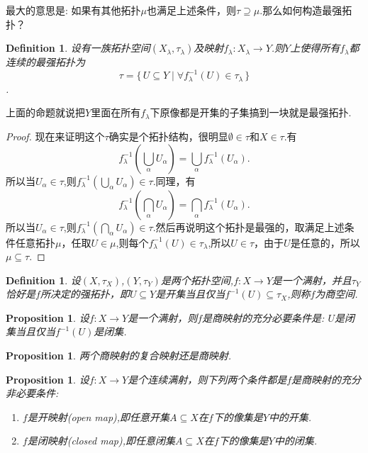 \documentclass{article}
\newtheorem{proposition}[theorem]{Proposition}
\newtheorem{definition}[theorem]{Definition}
\newcommand*{\xfunc}[4]{{#2}\colon{#3}{#1}{#4}}
\newcommand*{\func}[3]{\xfunc{\to}{#1}{#2}{#3}}
\newcommand\Set[2]{\{\,#1\mid#2\,\}} %
\begin{document}
最大的意思是: 如果有其他拓扑$\mu$也满足上述条件，则$\tau \supseteq \mu$.那么如何构造最强拓扑？

\begin{definition}
设有一族拓扑空间$(X_\lambda,\tau_\lambda)$及映射$\func{f_\lambda}{X_\lambda}{Y}$.则$Y$上使得所有$f_\lambda$都连续的最强拓扑为\[\tau = \Set{U \subseteq Y}{\forall f_\lambda^{-1}(U) \in \tau_\lambda}\].
\end{definition}

上面的命题就说把$Y$里面在所有$f_\lambda$下原像都是开集的子集搞到一块就是最强拓扑.

\begin{proof}
现在来证明这个$\tau$确实是个拓扑结构，很明显$\emptyset \in \tau$和$X \in \tau$.有\[f^{-1}_\lambda(\bigcup\limits_{\alpha} U_\alpha)=\bigcup\limits_\alpha f_\lambda^{-1}(U_\alpha).\]所以当$U_\alpha \in \tau$,则$f^{-1}_\lambda(\bigcup\limits_{\alpha} U_\alpha) \in \tau$.同理，有\[f^{-1}_\lambda(\bigcap\limits_{\alpha} U_\alpha)=\bigcap\limits_\alpha f_\lambda^{-1}(U_\alpha).\]所以当$U_\alpha \in \tau$,则$f^{-1}_\lambda(\bigcap\limits_{\alpha} U_\alpha) \in \tau$.然后再说明这个拓扑是最强的，取满足上述条件任意拓扑$\mu$，任取$U \in \mu$,则每个$f_\lambda^{-1}(U) \in \tau_\lambda$,所以$U \in \tau$，由于$U$是任意的，所以$\mu \subseteq \tau$.
\end{proof}

\begin{definition}
设$(X,\tau_X)$,$(Y,\tau_Y)$是两个拓扑空间,$\func{f}{X}{Y}$是一个满射，并且$\tau_Y$恰好是$f$所决定的强拓扑，即$U \subseteq Y$是开集当且仅当$f^{-1}(U) \subseteq \tau_X$,则称$f$为商空间.
\end{definition}

\begin{proposition}
设$\func{f}{X}{Y}$是一个满射，则$f$是商映射的充分必要条件是: $U$是闭集当且仅当$f^{-1}(U)$是闭集.
\end{proposition}

\begin{proposition}
两个商映射的复合映射还是商映射.
\end{proposition}

\begin{proposition}
设$\func{f}{X}{Y}$是个连续满射，则下列两个条件都是$f$是商映射的充分非必要条件:
\begin{enumerate}
	\item $f$是开映射(open map),即任意开集$A \subseteq X$在$f$下的像集是$Y$中的开集.
	\item $f$是闭映射(closed map),即任意闭集$A \subseteq X$在$f$下的像集是$Y$中的闭集.
\end{enumerate}
\end{proposition}
\end{document}
